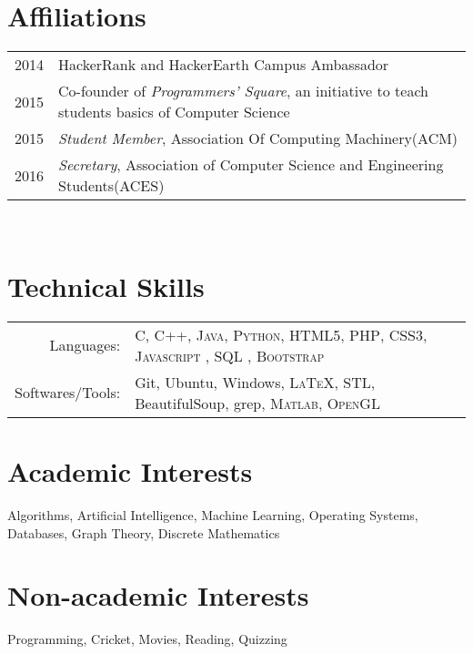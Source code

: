 \documentclass[margin,line]{res}
\begin{document}
\begin{resume}
\begin{tabular}{rl}
\end{tabular}

\section{\sc Affiliations} 
\begin{tabular}{rl}
2014 & HackerRank and HackerEarth Campus Ambassador\\
2015 & Co-founder of {\em Programmers' Square}, an initiative to teach students basics of Computer Science \\
2015 & {\em Student Member}, Association Of Computing Machinery(ACM) \\
2016 & {\em Secretary}, Association of Computer Science and Engineering Students(ACES)\\

\end{tabular}\\

\section{\sc Technical Skills}

\begin{tabular}{rl}
Languages: & \textsc{C}, \textsc{C++}, \textsc{Java}, \textsc{Python}, \textsc{HTML5}, \textsc{PHP}, \textsc{CSS3}, \textsc{Javascript} , \textsc{SQL} , \textsc{Bootstrap} \\

Softwares/Tools: & Git, Ubuntu, Windows, \textsc{LaTeX}, \textsc{STL}, BeautifulSoup, grep, \textsc{Matlab}, \textsc{OpenGL}\\

\end{tabular}

\section{\sc Academic Interests}
Algorithms, Artificial Intelligence, Machine Learning, Operating Systems, Databases, Graph Theory, Discrete Mathematics

\section{\sc Non-academic Interests}
Programming, Cricket, Movies, Reading, Quizzing 

\end{resume}
\end{document}
